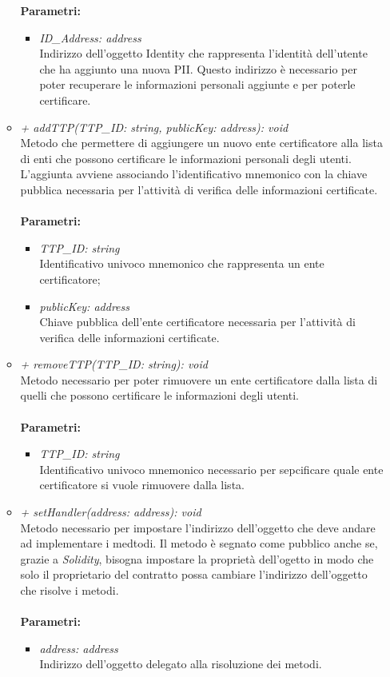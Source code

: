 \begin{itemize}
\begin{itemize}
		\textbf{Parametri:}
		\begin{itemize}
			\item \textit{ID\_Address: address}\\
			Indirizzo dell'oggetto Identity che rappresenta l'identità dell'utente che ha aggiunto una nuova \gls{PII}. Questo indirizzo è necessario per poter recuperare le informazioni personali aggiunte e per poterle certificare.			
		\end{itemize}
		\item \textit{+ addTTP(TTP\_ID: string, publicKey: address): void}\\
		Metodo che permettere di aggiungere un nuovo ente certificatore alla lista di enti che possono certificare le informazioni personali degli utenti. L'aggiunta avviene associando l'identificativo mnemonico con la chiave pubblica necessaria per l'attività di verifica delle informazioni certificate.\\\\
		\textbf{Parametri:}
		\begin{itemize}
			\item \textit{TTP\_ID: string}\\
			Identificativo univoco mnemonico che rappresenta un ente certificatore;
			\item \textit{publicKey: address}\\
			Chiave pubblica dell'ente certificatore necessaria per l'attività di verifica delle informazioni certificate.
		\end{itemize}
		\item \textit{+ removeTTP(TTP\_ID: string): void}\\
		Metodo necessario per poter rimuovere un ente certificatore dalla lista di quelli che possono certificare le informazioni degli utenti.\\\\
		\textbf{Parametri:}
		\begin{itemize}
			\item \textit{TTP\_ID: string}\\
			Identificativo univoco mnemonico necessario per sepcificare quale ente certificatore si vuole rimuovere dalla lista.
		\end{itemize}
		\item \textit{+ setHandler(address: address): void}\\
		Metodo necessario per impostare l'indirizzo dell'oggetto che deve andare ad implementare i medtodi. Il metodo è segnato come pubblico anche se, grazie a \textit{Solidity}, bisogna impostare la proprietà dell'ogetto in modo che solo il proprietario del contratto possa cambiare l'indirizzo dell'oggetto che risolve i metodi.\\\\
		\textbf{Parametri:}
		\begin{itemize}
			\item \textit{address: address}\\
			Indirizzo dell'oggetto delegato alla risoluzione dei metodi.
		\end{itemize}
	\end{itemize}
\end{itemize}
